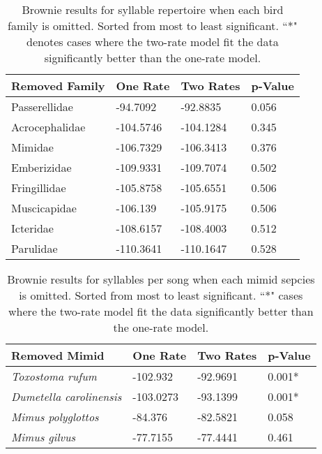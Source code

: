 \documentclass[a4paper,12pt]{article}
\begin{document}
\begin{table}[ht]
\caption{Brownie results for syllable repertoire when each bird family is omitted.  Sorted from most to least significant.  ``*" denotes cases where the two-rate model fit the data significantly better than the one-rate model.}
\centering
\begin{tabular}{llll}
  \hline
Removed Family & One Rate & Two Rates & p-Value \\ 
  \hline
Passerellidae & -94.7092 & -92.8835 & 0.056 \\ 
  Acrocephalidae & -104.5746 & -104.1284 & 0.345 \\ 
  Mimidae & -106.7329 & -106.3413 & 0.376 \\ 
  Emberizidae & -109.9331 & -109.7074 & 0.502 \\ 
  Fringillidae & -105.8758 & -105.6551 & 0.506 \\ 
  Muscicapidae & -106.139 & -105.9175 & 0.506 \\ 
  Icteridae & -108.6157 & -108.4003 & 0.512 \\ 
  Parulidae & -110.3641 & -110.1647 & 0.528 \\ 
   \hline
\end{tabular}
\end{table}


\begin{table}[ht]
\caption{Brownie results for syllables per song when each mimid sepcies is omitted.  Sorted from most to least significant.  ``*" cases where the two-rate model fit the data significantly better than the one-rate model.}
\centering
\begin{tabular}{llll}
  \hline
Removed Mimid & One Rate & Two Rates & p-Value \\ 
  \hline
\textit{Toxostoma rufum} & -102.932 & -92.9691 & 0.001* \\ 
  \textit{Dumetella carolinensis} & -103.0273 & -93.1399 & 0.001* \\ 
  \textit{Mimus polyglottos} & -84.376 & -82.5821 & 0.058 \\ 
  \textit{Mimus gilvus} & -77.7155 & -77.4441 & 0.461 \\ 
   \hline
\end{tabular}
\end{table}
\end{document}
